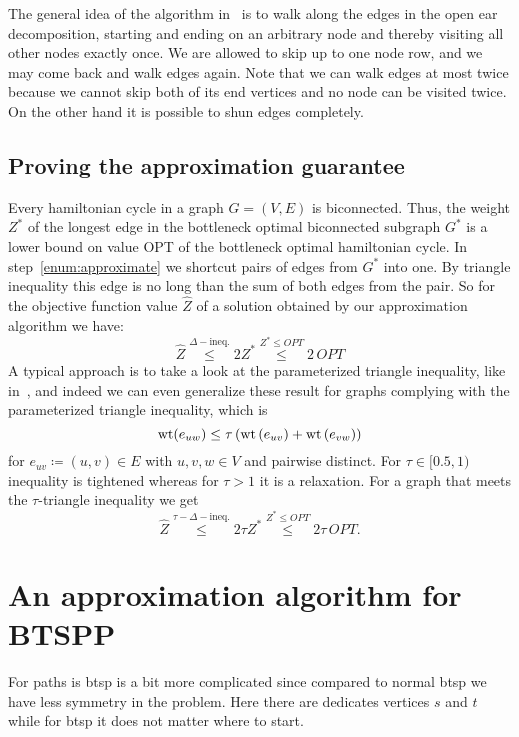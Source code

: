 The general idea of the algorithm in~\cite{alstrup2018hamiltonian} is to walk along the edges in the open ear decomposition, starting and ending on an arbitrary node and thereby visiting all other nodes exactly once. We are allowed to skip up to one node row, and we may come back and walk edges again. Note that we can walk edges at most twice because we cannot skip both of its end vertices and no node can be visited twice. On the other hand it is possible to shun edges completely.

\subsection{Proving the approximation guarantee}
Every hamiltonian cycle in a graph \(G = (V, E)\) is biconnected. Thus, the weight \(Z^\ast\) of the longest edge in the bottleneck optimal biconnected subgraph \(G^\ast\) is a lower bound on value OPT of the bottleneck optimal hamiltonian cycle. In step~\ref{enum:approximate} we shortcut pairs of edges from \(G^\ast\) into one. By triangle inequality this edge is no long than the sum of both edges from the pair.
So for the objective function value \(\hat{Z}\) of a solution obtained by our approximation algorithm we have:
\begin{equation}
  \hat{Z} \stackrel{\Delta-\text{ineq.}}{\leq} 2 Z^\ast \stackrel{Z^\ast \leq OPT}{\leq} 2 \, OPT
\end{equation}
A typical approach is to take a look at the parameterized triangle inequality, like in~\cite{bender1999generalizedTriangle}, and indeed we can even generalize these result for graphs complying with the parameterized triangle inequality, which is
\begin{equation*}
  \textrm{wt}(e_{uw}) \leq \tau \left(\textrm{wt}\left(e_{uv}\right) + \textrm{wt}\left(e_{vw}\right)\right)
\end{equation*}
for \(e_{uv} \coloneqq (u,v) \in E\) with \(u,v,w \in V\) and pairwise distinct. For \(\tau \in [0.5,1)\) inequality is tightened whereas for \(\tau > 1\) it is a relaxation.
For a graph that meets the \(\tau\)-triangle inequality we get
\begin{equation}
  \hat{Z} \stackrel{\tau-\Delta-\text{ineq.}}{\leq} 2 \tau Z^\ast \stackrel{Z^\ast \leq OPT}{\leq} 2 \tau \, OPT.
\end{equation}


\section{An approximation algorithm for BTSPP}
For paths is \gls{btsp} is a bit more complicated since compared to normal \gls{btsp} we have less symmetry in the problem. Here there are dedicates vertices \(s\) and \(t\) while for \gls{btsp} it does not matter where to start.


